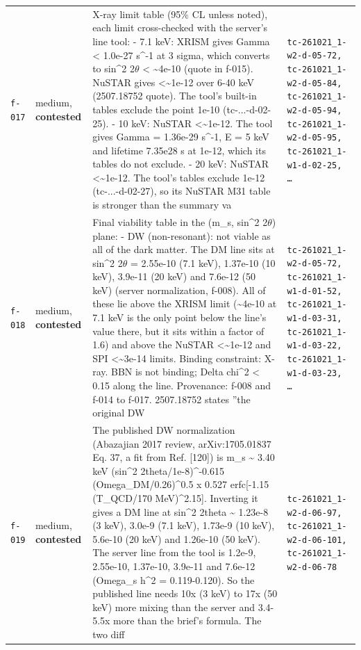 \documentclass[11pt,a4paper]{article}
\begin{document}
\begin{longtable}{@{}p{}p{}p{}p{}@{}}
\texttt{f-017} & medium, \textbf{contested} & X-ray limit table (95\% CL unless noted), each limit cross-checked with the server's line tool:
- 7.1 keV: XRISM gives Gamma \textless{} 1.0e-27 s\textasciicircum{}-1 at 3 sigma, which converts to sin\textasciicircum{}2 2$\theta$ \textless{} \textasciitilde{}4e-10 (quote in f-015). NuSTAR gives \textless{}\textasciitilde{}1e-12 over 6-40 keV (2507.18752 quote). The tool's built-in tables exclude the point 1e-10 (tc-...-d-02-25).
- 10 keV: NuSTAR \textless{}\textasciitilde{}1e-12. The tool gives Gamma = 1.36e-29 s\textasciicircum{}-1, E = 5 keV and lifetime 7.35e28 s at 1e-12, which its tables do not exclude.
- 20 keV: NuSTAR \textless{}\textasciitilde{}1e-12. The tool's tables exclude 1e-12 (tc-...-d-02-27), so its NuSTAR M31 table is stronger than the summary va & \texttt{tc-261021\_\allowbreak{}1-w2-d-05-72,\allowbreak{} tc-261021\_\allowbreak{}1-w2-d-05-84,\allowbreak{} tc-261021\_\allowbreak{}1-w2-d-05-94,\allowbreak{} tc-261021\_\allowbreak{}1-w2-d-05-95,\allowbreak{} tc-261021\_\allowbreak{}1-w1-d-02-25,\allowbreak{} \ldots{}\allowbreak{}} \\
\texttt{f-018} & medium, \textbf{contested} & Final viability table in the (m\_s, sin\textasciicircum{}2 2$\theta$) plane:
- DW (non-resonant): not viable as all of the dark matter. The DM line sits at sin\textasciicircum{}2 2$\theta$ = 2.55e-10 (7.1 keV), 1.37e-10 (10 keV), 3.9e-11 (20 keV) and 7.6e-12 (50 keV) (server normalization, f-008). All of these lie above the XRISM limit (\textasciitilde{}4e-10 at 7.1 keV is the only point below the line's value there, but it sits within a factor of 1.6) and above the NuSTAR \textless{}\textasciitilde{}1e-12 and SPI \textless{}\textasciitilde{}3e-14 limits. Binding constraint: X-ray. BBN is not binding; Delta chi\textasciicircum{}2 \textless{} 0.15 along the line. Provenance: f-008 and f-014 to f-017. 2507.18752 states ''the original DW  & \texttt{tc-261021\_\allowbreak{}1-w2-d-05-72,\allowbreak{} tc-261021\_\allowbreak{}1-w1-d-01-52,\allowbreak{} tc-261021\_\allowbreak{}1-w1-d-03-31,\allowbreak{} tc-261021\_\allowbreak{}1-w1-d-03-22,\allowbreak{} tc-261021\_\allowbreak{}1-w1-d-03-23,\allowbreak{} \ldots{}\allowbreak{}} \\
\texttt{f-019} & medium, \textbf{contested} & The published DW normalization (Abazajian 2017 review, arXiv:1705.01837 Eq. 37, a fit from Ref. [120]) is m\_s \textasciitilde{} 3.40 keV (sin\textasciicircum{}2 2theta/1e-8)\textasciicircum{}-0.615 (Omega\_DM/0.26)\textasciicircum{}0.5 x 0.527 erfc[-1.15 (T\_QCD/170 MeV)\textasciicircum{}2.15]. Inverting it gives a DM line at sin\textasciicircum{}2 2theta \textasciitilde{} 1.23e-8 (3 keV), 3.0e-9 (7.1 keV), 1.73e-9 (10 keV), 5.6e-10 (20 keV) and 1.26e-10 (50 keV). The server line from the tool is 1.2e-9, 2.55e-10, 1.37e-10, 3.9e-11 and 7.6e-12 (Omega\_s h\textasciicircum{}2 = 0.119-0.120). So the published line needs 10x (3 keV) to 17x (50 keV) more mixing than the server and 3.4-5.5x more than the brief's formula. The two diff & \texttt{tc-261021\_\allowbreak{}1-w2-d-06-97,\allowbreak{} tc-261021\_\allowbreak{}1-w2-d-06-101,\allowbreak{} tc-261021\_\allowbreak{}1-w2-d-06-78} \\

\end{longtable}
\end{document}
